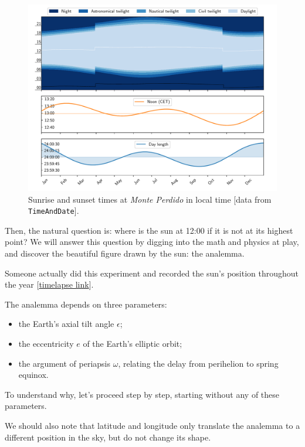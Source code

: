 \documentclass[12pt]{article}
\begin{document}
\begin{figure}[ht]
    \centering
    \includegraphics[width=\textwidth]{./sun_graph.pdf}
    \caption{
        Sunrise and sunset times at \textit{Monte Perdido} in local 
        time [data from \texttt{TimeAndDate}].
    }
    \label{fig:sunrise_sunset}
\end{figure}

Then, the natural question is: where is the sun at 12:00 if it is not at its 
highest point? We will answer this question by digging into the math and physics
at play, and discover the beautiful figure drawn by the sun: the analemma.

Someone actually did this experiment and recorded the sun's position
throughout the year 
[\href{https://www.youtube.com/watch?v=Deli5COMJhs}{timelapse link}].


\newpage
The analemma depends on three parameters:
\begin{itemize}
    \item the Earth's axial tilt angle $\epsilon$;
    \item the eccentricity $e$ of the Earth's elliptic orbit;
    \item the argument of periapsis $\omega$, relating the delay 
    from perihelion to spring equinox.
\end{itemize}
To understand why, let's proceed step by step, starting without any of these
parameters.

We should also note that latitude and longitude only translate the analemma
to a different position in the sky, but do not change its shape.
\end{document}
